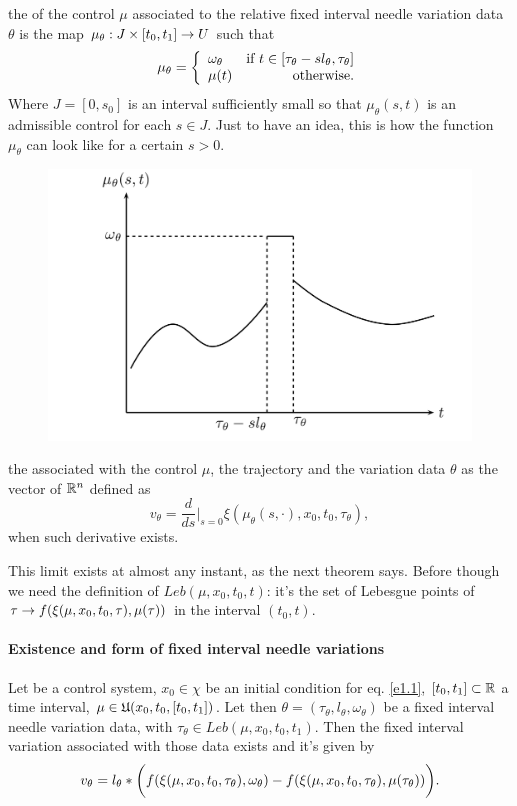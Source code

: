{	\item the  of the control $\mu$ associated to the relative fixed interval needle variation data $\theta$ is the map $\mu_\theta:J\times[t_0,t_1]\rightarrow U$ such that
	\[\mu_\theta = \left\{ \begin{array}{lr}
	\omega_\theta & \mbox{if $t\in[\tau_\theta-sl_\theta,\tau_\theta]$}\\
	\mu(t) & \mbox{otherwise}.\end{array}
	\right.	\]
	Where $J=[0,s_0]$ is an interval sufficiently small so that $\mu_\theta(s,t)$ is an admissible control for each $s\in J$.
	Just to have an idea, this is how the function $\mu_\theta$ can look like for a certain $s>0$.
	\begin{figure}[H]
		\includegraphics[width=\linewidth]{imgs/needle-variation.png}
		\caption{}
		\label{fig-needle-variation}
	\end{figure}
	\item the  associated with the control $\mu$, the trajectory \trajWinCond{\cdot} and the variation data $\theta$ as the vector of $\mathbb{R}^n$ defined as 
	\[v_\theta = \frac{d}{ds}\bigg|_{s=0} \xi(\mu_\theta(s,\cdot),x_0,t_0,\tau_\theta),\] when such derivative exists.
}
This limit exists at almost any instant, as the next theorem says. Before though we need the definition of $Leb(\mu,x_0,t_0,t)$: it's the set of Lebesgue points of $\tau\rightarrow f(\xi(\mu,x_0,t_0,\tau),\mu(\tau))$ in the interval $(t_0,t)$.

\paragraph[prop 4.9]{Existence and form of fixed interval needle variations}
\begin{teo}
	 Let \controlSystem\space be a control system, $x_0\in\chi$ be an initial condition for eq. \eqref{e1.1}, $[t_0,t_1]\subset\mathbb{R}$ a time interval, $\mu\in\mathfrak{U}(x_0,t_0,[t_0,t_1])$. Let then $\theta=(\tau_\theta,l_\theta,\omega_\theta)$ be a fixed interval needle variation data, with $\tau_\theta\in Leb(\mu,x_0,t_0,t_1)$. Then the fixed interval variation associated with those data exists and it's given by
\[ v_\theta=l_\theta*\bigg(f(\xi(\mu,x_0,t_0,\tau_\theta),\omega_\theta) - f(\xi(\mu,x_0,t_0,\tau_\theta),\mu(\tau_\theta) )  \bigg). \]
	\label{4-9}
	\label{T5}
\end{teo}

